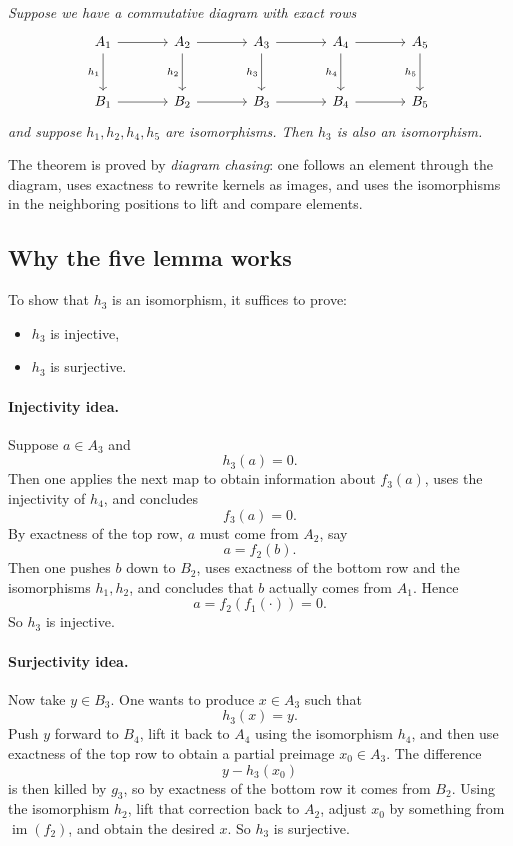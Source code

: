 \documentclass[12pt,a4paper]{article}
\theoremstyle{notespace}
\begin{document}
\emph{Suppose we have a commutative diagram with exact rows}
\[
\begin{tikzcd}[column sep=large, row sep=large]
	A_1 \arrow[r] \arrow[d,"h_1"'] &
	A_2 \arrow[r] \arrow[d,"h_2"'] &
	A_3 \arrow[r] \arrow[d,"h_3"'] &
	A_4 \arrow[r] \arrow[d,"h_4"'] &
	A_5 \arrow[d,"h_5"'] \\
	B_1 \arrow[r] &
	B_2 \arrow[r] &
	B_3 \arrow[r] &
	B_4 \arrow[r] &
	B_5
\end{tikzcd}
\]
\emph{and suppose \(h_1,h_2,h_4,h_5\) are isomorphisms. Then \(h_3\) is also an isomorphism.}

\medskip

The theorem is proved by \emph{diagram chasing}: one follows an element through the diagram, uses exactness to rewrite kernels as images, and uses the isomorphisms in the neighboring positions to lift and compare elements.

\subsection{Why the five lemma works}

To show that \(h_3\) is an isomorphism, it suffices to prove:

\begin{itemize}
	\item \(h_3\) is injective,
	\item \(h_3\) is surjective.
\end{itemize}

\paragraph{Injectivity idea.}
Suppose \(a\in A_3\) and
\[
h_3(a)=0.
\]
Then one applies the next map to obtain information about \(f_3(a)\), uses the injectivity of \(h_4\), and concludes
\[
f_3(a)=0.
\]
By exactness of the top row, \(a\) must come from \(A_2\), say
\[
a=f_2(b).
\]
Then one pushes \(b\) down to \(B_2\), uses exactness of the bottom row and the isomorphisms \(h_1,h_2\), and concludes that \(b\) actually comes from \(A_1\). Hence
\[
a=f_2(f_1(\cdot))=0.
\]
So \(h_3\) is injective.

\paragraph{Surjectivity idea.}
Now take \(y\in B_3\). One wants to produce \(x\in A_3\) such that
\[
h_3(x)=y.
\]
Push \(y\) forward to \(B_4\), lift it back to \(A_4\) using the isomorphism \(h_4\), and then use exactness of the top row to obtain a partial preimage \(x_0\in A_3\). The difference
\[
y-h_3(x_0)
\]
is then killed by \(g_3\), so by exactness of the bottom row it comes from \(B_2\). Using the isomorphism \(h_2\), lift that correction back to \(A_2\), adjust \(x_0\) by something from \(\operatorname{im}(f_2)\), and obtain the desired \(x\). So \(h_3\) is surjective.
\end{document}
